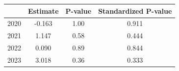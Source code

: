 \begin{tabular}{lccc}
\hline
 & Estimate & P-value & Standardized P-value \\
\hline
2020 & -0.163 & 1.00 & 0.911 \\
2021 & 1.147 & 0.58 & 0.444 \\
2022 & 0.090 & 0.89 & 0.844 \\
2023 & 3.018 & 0.36 & 0.333 \\
\hline
\end{tabular}
